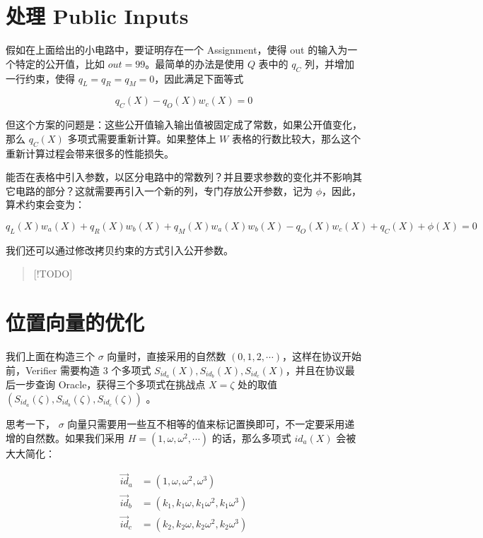 \hypertarget{ux5904ux7406-public-inputs}{%
\section{处理 Public Inputs}\label{ux5904ux7406-public-inputs}}

假如在上面给出的小电路中，要证明存在一个 Assignment，使得 out
的输入为一个特定的公开值，比如 \(out=99\)。最简单的办法是使用 \(Q\)
表中的 \(q_C\) 列，并增加一行约束，使得
\(q_L=q_R=q_M=0\)，因此满足下面等式

\[
q_C(X) - q_O(X)w_c(X)  = 0
\]

但这个方案的问题是：这些公开值输入输出值被固定成了常数，如果公开值变化，那么
\(q_C(X)\) 多项式需要重新计算。如果整体上 \(W\)
表格的行数比较大，那么这个重新计算过程会带来很多的性能损失。

能否在表格中引入参数，以区分电路中的常数列？并且要求参数的变化并不影响其它电路的部分？这就需要再引入一个新的列，专门存放公开参数，记为
\(\phi\)，因此，算术约束会变为：

\[
q_L(X)w_a(X)+q_R(X)w_b(X)+ q_M(X)w_a(X)w_b(X) - q_O(X)w_c(X)+q_C(X)+\phi(X) = 0
\]

我们还可以通过修改拷贝约束的方式引入公开参数。

\begin{quote}
{[}!TODO{]}
\end{quote}

\hypertarget{ux4f4dux7f6eux5411ux91cfux7684ux4f18ux5316}{%
\section{位置向量的优化}\label{ux4f4dux7f6eux5411ux91cfux7684ux4f18ux5316}}

我们上面在构造三个 \(\sigma\) 向量时，直接采用的自然数
\((0,1,2,\cdots)\)，这样在协议开始前，Verifier 需要构造 3 个多项式
\(S_{id_a}(X),S_{id_b}(X),S_{id_c}(X)\)，并且在协议最后一步查询
Oracle，获得三个多项式在挑战点 \(X=\zeta\) 处的取值
\((S_{id_a}(\zeta),S_{id_b}(\zeta),S_{id_c}(\zeta))\) 。

思考一下， \(\sigma\)
向量只需要用一些互不相等的值来标记置换即可，不一定要采用递增的自然数。如果我们采用
\(H=(1,\omega,\omega^2,\cdots)\) 的话，那么多项式 \({id_a}(X)\)
会被大大简化：

\[
\begin{split}
\vec{id}_a &= (1,\omega,\omega^2,\omega^3)\\
\vec{id}_b &= (k_1,k_1\omega,k_1\omega^2,k_1\omega^3)\\
\vec{id}_c &= (k_2,k_2\omega,k_2\omega^2,k_2\omega^3)\\
\end{split}
\]

